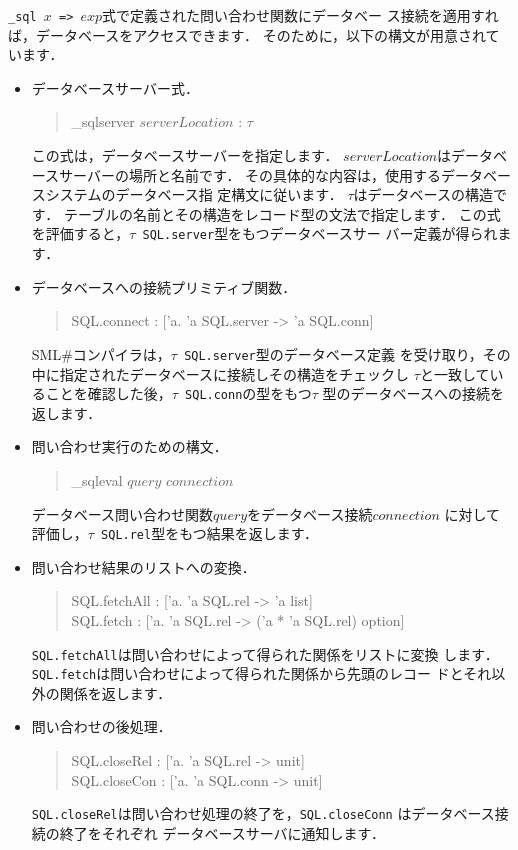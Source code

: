 \documentclass{jbook}
\newif\ifjp
\newcommand{\smlsharp}{SML\#}
\newenvironment{program}{\begin{quote}\begin{tt}}%
                        {\end{tt}\end{quote}}
\begin{document}
\ifjp%
	{\tt \_sql $x$ => $exp$}式で定義された問い合わせ関数にデータベー
ス接続を適用すれば，データベースをアクセスできます．
	そのために，以下の構文が用意されています．
\begin{itemize}
\item データベースサーバー式．
\begin{program}
\_sqlserver $serverLocation$ : $\tau$
\end{program}
	この式は，データベースサーバーを指定します．
	$serverLocation$はデータベースサーバーの場所と名前です．
	その具体的な内容は，使用するデータベースシステムのデータベース指
定構文に従います．
	$\tau$はデータベースの構造です．
	テーブルの名前とその構造をレコード型の文法で指定します．
	この式を評価すると，{\tt $\tau$ SQL.server}型をもつデータベースサー
バー定義が得られます．
\item データベースへの接続プリミティブ関数．
\begin{program}
SQL.connect : ['a. 'a SQL.server -> 'a SQL.conn]
\end{program}
	\smlsharp{}コンパイラは，{\tt $\tau$ SQL.server}型のデータベース定義
を受け取り，その中に指定されたデータベースに接続しその構造をチェックし
$\tau$と一致していることを確認した後，{\tt $\tau$ SQL.conn}の型をもつ$\tau$
型のデータベースへの接続を返します．
	
\item 問い合わせ実行のための構文．
\begin{program}
\_sqleval $query$ $connection$
\end{program}
	データベース問い合わせ関数$query$をデータベース接続$connection$
に対して評価し，{\tt $\tau$ SQL.rel}型をもつ結果を返します．

\item 問い合わせ結果のリストへの変換．
\begin{program}
SQL.fetchAll : ['a. 'a SQL.rel -> 'a list]\\
SQL.fetch : ['a. 'a SQL.rel -> ('a * 'a SQL.rel) option]
\end{program}
	{\tt SQL.fetchAll}は問い合わせによって得られた関係をリストに変換
します．
	{\tt SQL.fetch}は問い合わせによって得られた関係から先頭のレコー
ドとそれ以外の関係を返します．
\item 問い合わせの後処理．
\begin{program}
SQL.closeRel : ['a. 'a SQL.rel -> unit]\\
SQL.closeCon : ['a. 'a SQL.conn -> unit]
\end{program}
	{\tt SQL.closeRel}は問い合わせ処理の終了を，{\tt SQL.closeConn}
はデータベース接続の終了をそれぞれ
データベースサーバに通知します．
\end{itemize}
\end{document}
